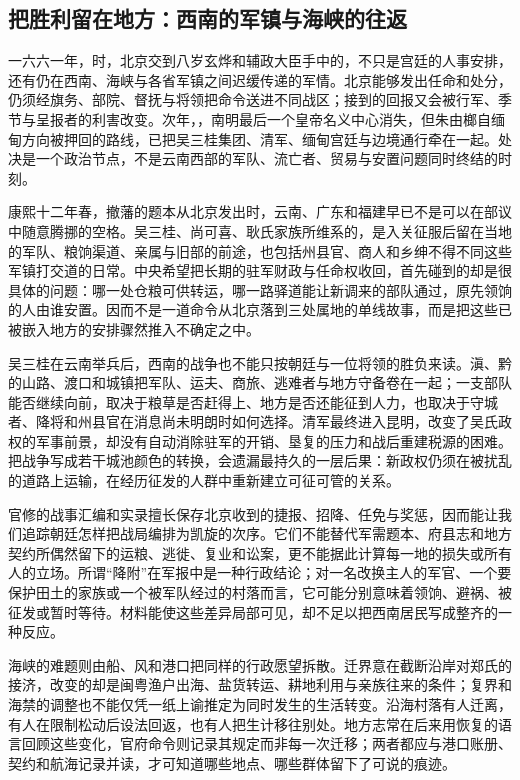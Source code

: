 \subsection{把胜利留在地方：西南的军镇与海峡的往返}

一六六一年，时，北京交到八岁玄烨和辅政大臣手中的，不只是宫廷的人事安排，还有仍在西南、海峡与各省军镇之间迟缓传递的军情。北京能够发出任命和处分，仍须经旗务、部院、督抚与将领把命令送进不同战区；接到的回报又会被行军、季节与呈报者的利害改变。次年，，南明最后一个皇帝名义中心消失，但朱由榔自缅甸方向被押回的路线，已把吴三桂集团、清军、缅甸宫廷与边境通行牵在一起。处决是一个政治节点，不是云南西部的军队、流亡者、贸易与安置问题同时终结的时刻。

康熙十二年春，撤藩的题本从北京发出时，云南、广东和福建早已不是可以在部议中随意腾挪的空格。吴三桂、尚可喜、耿氏家族所维系的，是入关征服后留在当地的军队、粮饷渠道、亲属与旧部的前途，也包括州县官、商人和乡绅不得不同这些军镇打交道的日常。中央希望把长期的驻军财政与任命权收回，首先碰到的却是很具体的问题：哪一处仓粮可供转运，哪一路驿道能让新调来的部队通过，原先领饷的人由谁安置。因而不是一道命令从北京落到三处属地的单线故事，而是把这些已被嵌入地方的安排骤然推入不确定之中。

吴三桂在云南举兵后，西南的战争也不能只按朝廷与一位将领的胜负来读。滇、黔的山路、渡口和城镇把军队、运夫、商旅、逃难者与地方守备卷在一起；一支部队能否继续向前，取决于粮草是否赶得上、地方是否还能征到人力，也取决于守城者、降将和州县官在消息尚未明朗时如何选择。清军最终进入昆明，改变了吴氏政权的军事前景，却没有自动消除驻军的开销、垦复的压力和战后重建税源的困难。把战争写成若干城池颜色的转换，会遗漏最持久的一层后果：新政权仍须在被扰乱的道路上运输，在经历征发的人群中重新建立可征可管的关系。

官修的战事汇编和实录擅长保存北京收到的捷报、招降、任免与奖惩，因而能让我们追踪朝廷怎样把战局编排为凯旋的次序。它们不能替代军需题本、府县志和地方契约所偶然留下的运粮、逃徙、复业和讼案，更不能据此计算每一地的损失或所有人的立场。所谓“降附”在军报中是一种行政结论；对一名改换主人的军官、一个要保护田土的家族或一个被军队经过的村落而言，它可能分别意味着领饷、避祸、被征发或暂时等待。材料能使这些差异局部可见，却不足以把西南居民写成整齐的一种反应。

海峡的难题则由船、风和港口把同样的行政愿望拆散。迁界意在截断沿岸对郑氏的接济，改变的却是闽粤渔户出海、盐货转运、耕地利用与亲族往来的条件；复界和海禁的调整也不能仅凭一纸上谕推定为同时发生的生活转变。沿海村落有人迁离，有人在限制松动后设法回返，也有人把生计移往别处。地方志常在后来用恢复的语言回顾这些变化，官府命令则记录其规定而非每一次迁移；两者都应与港口账册、契约和航海记录并读，才可知道哪些地点、哪些群体留下了可说的痕迹。

